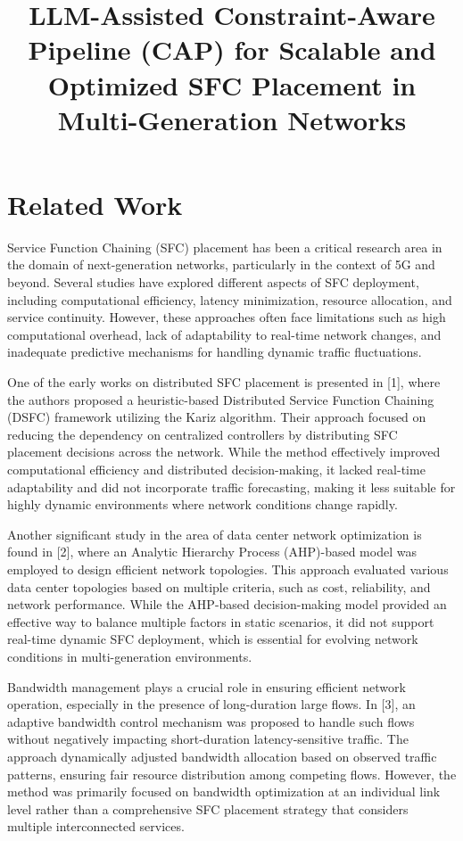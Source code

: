 \documentclass[conference]{IEEEtran}
\title{LLM-Assisted Constraint-Aware Pipeline (CAP) for Scalable and Optimized SFC Placement in Multi-Generation Networks}
\author{
	\IEEEauthorblockN{Author 1, Author 2, Author 3, Author 4}
	\IEEEauthorblockA{Department of Computer Science, University Name, Country\\
		Email: author1@example.com, author2@example.com, author3@example.com, author4@example.com}
}
\begin{document}
	
	\maketitle
	
	\section{Related Work}
	
	Service Function Chaining (SFC) placement has been a critical research area in the domain of next-generation networks, particularly in the context of 5G and beyond. Several studies have explored different aspects of SFC deployment, including computational efficiency, latency minimization, resource allocation, and service continuity. However, these approaches often face limitations such as high computational overhead, lack of adaptability to real-time network changes, and inadequate predictive mechanisms for handling dynamic traffic fluctuations.
	
	One of the early works on distributed SFC placement is presented in [1], where the authors proposed a heuristic-based Distributed Service Function Chaining (DSFC) framework utilizing the Kariz algorithm. Their approach focused on reducing the dependency on centralized controllers by distributing SFC placement decisions across the network. While the method effectively improved computational efficiency and distributed decision-making, it lacked real-time adaptability and did not incorporate traffic forecasting, making it less suitable for highly dynamic environments where network conditions change rapidly.
	
	Another significant study in the area of data center network optimization is found in [2], where an Analytic Hierarchy Process (AHP)-based model was employed to design efficient network topologies. This approach evaluated various data center topologies based on multiple criteria, such as cost, reliability, and network performance. While the AHP-based decision-making model provided an effective way to balance multiple factors in static scenarios, it did not support real-time dynamic SFC deployment, which is essential for evolving network conditions in multi-generation environments.
	
	Bandwidth management plays a crucial role in ensuring efficient network operation, especially in the presence of long-duration large flows. In [3], an adaptive bandwidth control mechanism was proposed to handle such flows without negatively impacting short-duration latency-sensitive traffic. The approach dynamically adjusted bandwidth allocation based on observed traffic patterns, ensuring fair resource distribution among competing flows. However, the method was primarily focused on bandwidth optimization at an individual link level rather than a comprehensive SFC placement strategy that considers multiple interconnected services.
	
\end{document}
